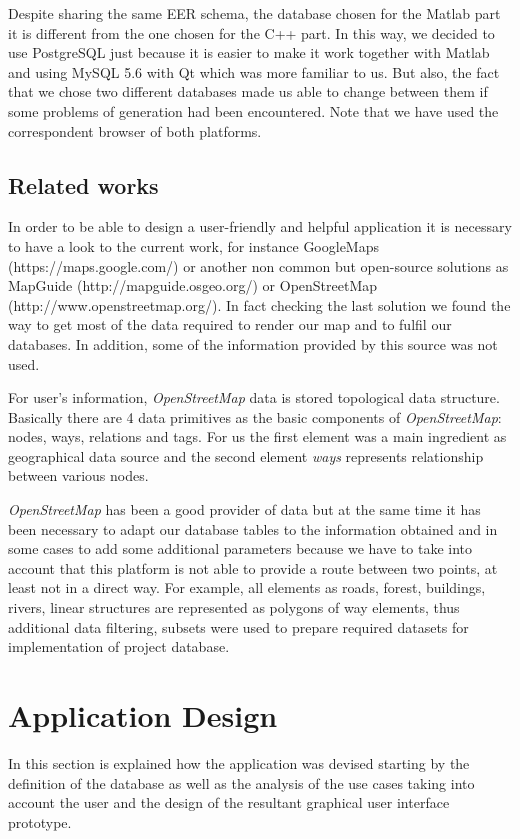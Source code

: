 \documentclass{article}
\begin{document}
Despite sharing the same EER schema, the database chosen for the Matlab part it is different from the one chosen for the C++ part. In this way, we decided to use PostgreSQL just because it is easier to make it work together with Matlab and using MySQL 5.6 with Qt which was more familiar to us. But also, the fact that we chose two different databases made us able to change between them if some problems of generation had been encountered. Note that we have used the correspondent browser of both platforms.

\subsection{Related works}

In order to be able to design a user-friendly and helpful application it is necessary to have a look to the current work, for instance GoogleMaps (https://maps.google.com/) or another non common but open-source solutions as MapGuide (http://mapguide.osgeo.org/) or OpenStreetMap (http://www.openstreetmap.org/). In fact checking the last solution we found the way to get most of the data required to render our map and to fulfil our databases. In addition, some of the information provided by this source was not used.

For user's information, \textit{OpenStreetMap} data is stored topological data structure. Basically there are 4 data primitives as the basic components of \textit{OpenStreetMap}: nodes, ways, relations and tags. For us the first element was a main ingredient as geographical data source and the second element \textit{ways} represents relationship between various nodes. 

\textit{OpenStreetMap} has been a good provider of data but at the same time it has been necessary to adapt our database tables to the information obtained and in some cases to add some additional parameters because we have to take into account that this platform is not able to provide a route between two points, at least not in a direct way. For example, all elements as roads, forest, buildings, rivers, linear structures are represented as polygons of way elements, thus additional data filtering, subsets were used to prepare required datasets for implementation of project database.



\section{Application Design}
In this section is explained how the application was devised starting by the definition of the database as well as the analysis of the use cases taking into account the user and the design of the resultant graphical user interface prototype.
\end{document}
